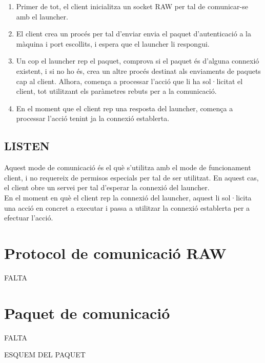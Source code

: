 \begin{enumerate}
    \item Primer de tot, el client inicialitza un socket RAW per tal de comunicar-se amb el launcher.
    \item El client crea un procés per tal d'enviar envia el paquet d'autenticació a la màquina i port escollits,
        i espera que el launcher li respongui.
    \item Un cop el launcher rep el paquet, comprova si el paquet és d'alguna connexió existent, i si no
        ho és, crea un altre procés destinat als enviaments de paquets cap al client. Alhora, comença a
        processar l'acció que li ha sol·licitat el client, tot utilitzant els paràmetres rebuts per a la 
        comunicació.
    \item En el moment que el client rep una resposta del launcher, comença a processar l'acció tenint
        ja la connexió establerta.
\end{enumerate}

\subsection{LISTEN}

Aquest mode de comunicació és el què s'utilitza amb el mode de funcionament client, i no requereix de permisos
especials per tal de ser utilitzat. En aquest cas, el client obre un servei per tal d'esperar la connexió del 
launcher.  \\

En el moment en què el client rep la connexió del launcher, aquest li sol·licita una acció en concret a executar
i passa a utilitzar la connexió establerta per a efectuar l'acció. \\

\section{Protocol de comunicació RAW}

FALTA

\section{Paquet de comunicació}

FALTA

ESQUEM DEL PAQUET
